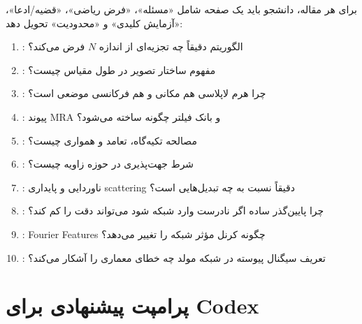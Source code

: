 برای هر مقاله، دانشجو باید یک صفحه شامل «مسئله»، «فرض ریاضی»، «قضیه/ادعا»، «آزمایش کلیدی» و «محدودیت»
تحویل دهد:
\begin{enumerate}
\item {}: الگوریتم دقیقاً چه تجزیه‌ای از اندازه \(N\) فرض می‌کند؟
\item {}: مفهوم ساختار تصویر در طول مقیاس چیست؟
\item {}: چرا هرم لاپلاسی هم مکانی و هم فرکانسی موضعی است؟
\item {}: پیوند MRA و بانک فیلتر چگونه ساخته می‌شود؟
\item {}: مصالحه تکیه‌گاه، تعامد و همواری چیست؟
\item {}: شرط جهت‌پذیری در حوزه زاویه چیست؟
\item {}: ناوردایی و پایداری scattering دقیقاً نسبت به چه تبدیل‌هایی است؟
\item {}: چرا پایین‌گذر ساده اگر نادرست وارد شبکه شود می‌تواند دقت را کم کند؟
\item {}: Fourier Features چگونه کرنل مؤثر شبکه را تغییر می‌دهد؟
\item {}: تعریف سیگنال پیوسته در شبکه مولد چه خطای معماری را آشکار می‌کند؟
\end{enumerate}

\section{پرامپت پیشنهادی برای Codex}

